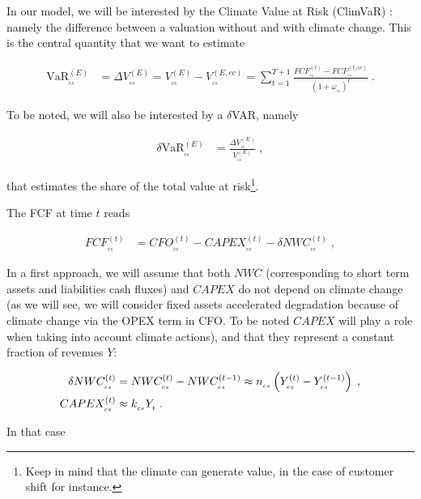 \vspace{0.2cm}

In our model, we will be interested by the Climate Value at Risk (ClimVaR) \cite{Kruschwitz}\cite{Valuation}\cite{Damodaran1}: namely the difference between a valuation without and with climate change. This is the central quantity that we want to estimate

\begin{align}
\text{VaR}^{(E)}_{_{cs}}&=\Delta V^{(E)}_{_{cs}}=V^{(E)}_{_{cs}}-V^{(E,cc)}_{_{cs}}
%
=\sum_{t=1}^{T+1}\frac{FCF^{(t)}_{_{cs}}-FCF^{(t,cc)}_{_{cs}}}{\left(1+\omega_{_{cs}}\right)^t}\;.\label{eq:var}
\end{align}

To be noted, we will also be interested by a $\delta$VAR, namely

\begin{align}
\delta \text{VaR}^{(E)}_{_{cs}}&=\frac{\Delta V^{(E)}_{_{cs}}}{V^{(E)}_{_{cs}}}\;,\label{eq:delta-var}
\end{align}

that estimates the share of the total value at risk\footnote{Keep in mind that the climate can generate value, in the case of customer shift for instance.}.

\vspace{0.2cm}

The FCF at time $t$ reads \cite{Damodaran1}

\begin{align}
FCF^{(t)}_{_{cs}}&=CFO^{(t)}_{_{cs}}- CAPEX^{(t)}_{_{cs}} - \delta NWC^{(t)}_{_{cs}}\;,
\end{align}


In a first approach, we will assume that both $NWC$ (corresponding to short term assets and liabilities cash fluxes) and $CAPEX$ do not depend on climate change (as we will see, we will consider fixed assets accelerated degradation because of climate change via the OPEX term in CFO. To be noted $CAPEX$ will play a role when taking into account climate actions), and that they represent a constant fraction of revenues $Y$:

\begin{align}
\delta NWC^{(t)}_{_{cs}}&=
%
NWC^{(t)}_{_{cs}}- NWC^{(t-1)}_{_{cs}}\approx
%
 n_{_{cs}}\left(Y^{(t)}_{_{cs}} - Y^{(t-1)}_{_{cs}}\right)\;,\notag\\
%
CAPEX^{(t)}_{_{cs}} & \approx k_{_{cs}}Y_{_t}\;.
\end{align}

In that case

